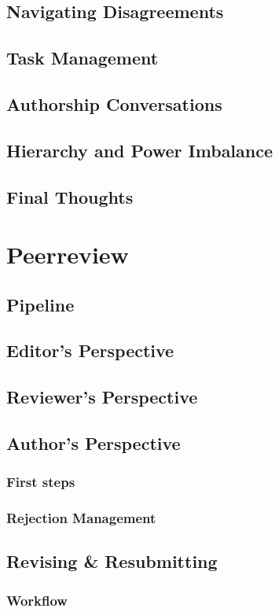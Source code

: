 \documentclass[12pt]{article}
\begin{document}
\subsection{Navigating Disagreements}
\subsection{Task Management}
\subsection{Authorship Conversations}
\subsection{Hierarchy and Power Imbalance}
\subsection{Final Thoughts}

\section{Peerreview}
\subsection{Pipeline}
\subsection{Editor's Perspective}
\subsection{Reviewer's Perspective}
\subsection{Author's Perspective}
\subsubsection{First steps}
\subsubsection{Rejection Management}
\subsection{Revising \& Resubmitting}
\subsubsection{Workflow}
\end{document}
